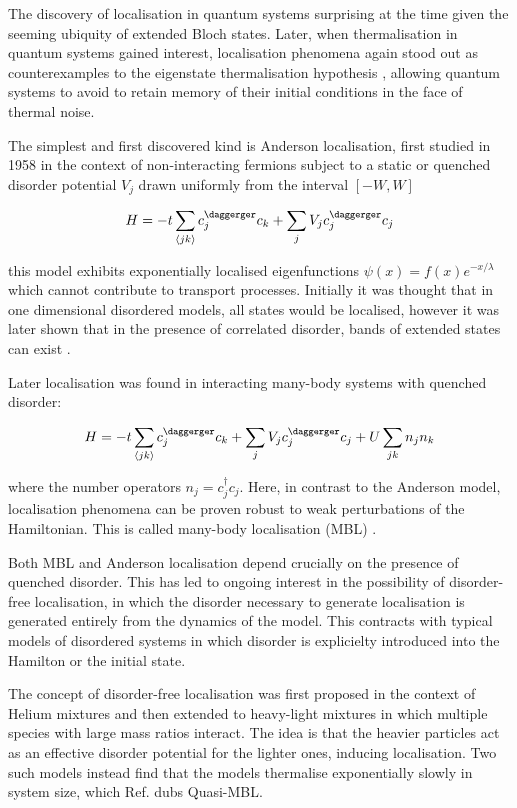 The discovery of localisation in quantum systems surprising at the time given the seeming ubiquity of extended Bloch states. Later, when thermalisation in quantum systems gained interest, localisation phenomena again stood out as counterexamples to the eigenstate thermalisation hypothesis \autocite{abaninRecentProgressManybody2017,srednickiChaosQuantumThermalization1994}, allowing quantum systems to avoid to retain memory of their initial conditions in the face of thermal noise.

The simplest and first discovered kind is Anderson localisation, first studied in 1958 \autocite{andersonAbsenceDiffusionCertain1958} in the context of non-interacting fermions subject to a static or quenched disorder potential \(V_j\) drawn uniformly from the interval \([-W,W]\)

\[
H = -t\sum_{\langle jk \rangle} c^\daggerger_j c_k + \sum_j V_j c_j^\daggerger c_j
\]

this model exhibits exponentially localised eigenfunctions \(\psi(x) = f(x) e^{-x/\lambda}\) which cannot contribute to transport processes. Initially it was thought that in one dimensional disordered models, all states would be localised, however it was later shown that in the presence of correlated disorder, bands of extended states can exist \autocite{izrailevLocalizationMobilityEdge1999,croyAndersonLocalization1D2011,izrailevAnomalousLocalizationLowDimensional2012}.

Later localisation was found in interacting many-body systems with quenched disorder:

\[
H = -t\sum_{\langle jk \rangle} c^\daggerger_j c_k + \sum_j V_j c_j^\daggerger c_j + U\sum_{jk} n_j n_k
\]

where the number operators \(n_j = c^\dagger_j c_j\). Here, in contrast to the Anderson model, localisation phenomena can be proven robust to weak perturbations of the Hamiltonian. This is called many-body localisation (MBL) \autocite{imbrieManyBodyLocalizationQuantum2016}.

Both MBL and Anderson localisation depend crucially on the presence of quenched disorder. This has led to ongoing interest in the possibility of disorder-free localisation, in which the disorder necessary to generate localisation is generated entirely from the dynamics of the model. This contracts with typical models of disordered systems in which disorder is explicielty introduced into the Hamilton or the initial state.

The concept of disorder-free localisation was first proposed in the context of Helium mixtures \autocite{kagan1984localization} and then extended to heavy-light mixtures in which multiple species with large mass ratios interact. The idea is that the heavier particles act as an effective disorder potential for the lighter ones, inducing localisation. Two such models \autocite{yaoQuasiManyBodyLocalizationTranslationInvariant2016,schiulazDynamicsManybodyLocalized2015} instead find that the models thermalise exponentially slowly in system size, which Ref. \autocite{yaoQuasiManyBodyLocalizationTranslationInvariant2016} dubs Quasi-MBL.

